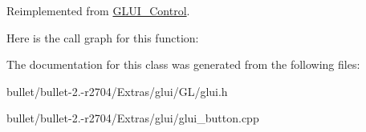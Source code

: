 Reimplemented from \hyperlink{class_g_l_u_i___control}{G\+L\+U\+I\+\_\+\+Control}.



Here is the call graph for this function\+:




The documentation for this class was generated from the following files\+:\begin{DoxyCompactItemize}
\item 
bullet/bullet-\/2.-\/r2704/\+Extras/glui/\+G\+L/glui.\+h\item 
bullet/bullet-\/2.-\/r2704/\+Extras/glui/glui\+\_\+button.\+cpp\end{DoxyCompactItemize}
